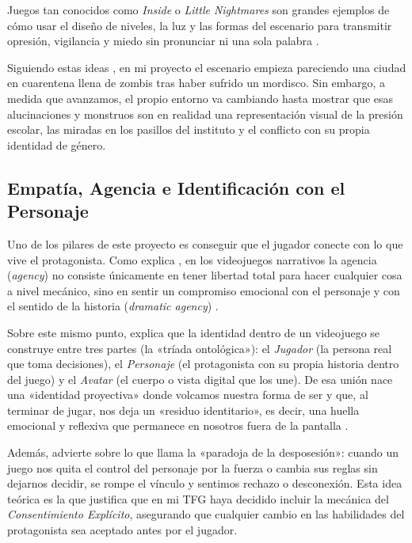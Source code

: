Juegos tan conocidos como \textit{Inside} \parencite{playdead2016} o \textit{Little Nightmares} \parencite{tarsier2017} son grandes ejemplos de cómo usar el diseño de niveles, la luz y las formas del escenario para transmitir opresión, vigilancia y miedo sin pronunciar ni una sola palabra \parencite{boyero2025}.

Siguiendo estas ideas \parencite{finestrat2018, boyero2025}, en mi proyecto el escenario empieza pareciendo una ciudad en cuarentena llena de zombis tras haber sufrido un mordisco. Sin embargo, a medida que avanzamos, el propio entorno va cambiando hasta mostrar que esas alucinaciones y monstruos son en realidad una representación visual de la presión escolar, las miradas en los pasillos del instituto y el conflicto con su propia identidad de género.

\subsection{Empatía, Agencia e Identificación con el Personaje}
Uno de los pilares de este proyecto es conseguir que el jugador conecte con lo que vive el protagonista. Como explica \textcite{cuadrado2020}, en los videojuegos narrativos la agencia (\textit{agency}) no consiste únicamente en tener libertad total para hacer cualquier cosa a nivel mecánico, sino en sentir un compromiso emocional con el personaje y con el sentido de la historia (\textit{dramatic agency}) \parencite{cuadrado2020, hernandez2024}.

Sobre este mismo punto, \textcite{gomez2026} explica que la identidad dentro de un videojuego se construye entre tres partes (la «tríada ontológica»): el \textit{Jugador} (la persona real que toma decisiones), el \textit{Personaje} (el protagonista con su propia historia dentro del juego) y el \textit{Avatar} (el cuerpo o vista digital que los une). De esa unión nace una «identidad proyectiva» donde volcamos nuestra forma de ser y que, al terminar de jugar, nos deja un «residuo identitario», es decir, una huella emocional y reflexiva que permanece en nosotros fuera de la pantalla \parencite{gomez2026}.

Además, \textcite{gomez2026} advierte sobre lo que llama la «paradoja de la desposesión»: cuando un juego nos quita el control del personaje por la fuerza o cambia sus reglas sin dejarnos decidir, se rompe el vínculo y sentimos rechazo o desconexión. Esta idea teórica es la que justifica que en mi \ac{TFG} haya decidido incluir la mecánica del \textit{Consentimiento Explícito}, asegurando que cualquier cambio en las habilidades del protagonista sea aceptado antes por el jugador.

